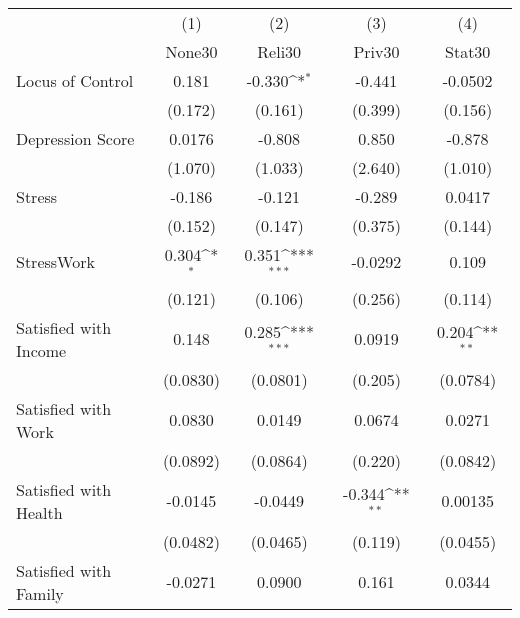 {
\def\sym#1{\ifmmode^{#1}\else\(^{#1}\)\fi}
\begin{tabular}{l*{4}{c}}
\hline\hline
            &\multicolumn{1}{c}{(1)}&\multicolumn{1}{c}{(2)}&\multicolumn{1}{c}{(3)}&\multicolumn{1}{c}{(4)}\\
            &\multicolumn{1}{c}{None30}&\multicolumn{1}{c}{Reli30}&\multicolumn{1}{c}{Priv30}&\multicolumn{1}{c}{Stat30}\\
\hline
Locus of Control&       0.181         &      -0.330\sym{*}  &      -0.441         &     -0.0502         \\
            &     (0.172)         &     (0.161)         &     (0.399)         &     (0.156)         \\
[1em]
Depression Score&      0.0176         &      -0.808         &       0.850         &      -0.878         \\
            &     (1.070)         &     (1.033)         &     (2.640)         &     (1.010)         \\
[1em]
Stress      &      -0.186         &      -0.121         &      -0.289         &      0.0417         \\
            &     (0.152)         &     (0.147)         &     (0.375)         &     (0.144)         \\
[1em]
StressWork  &       0.304\sym{*}  &       0.351\sym{***}&     -0.0292         &       0.109         \\
            &     (0.121)         &     (0.106)         &     (0.256)         &     (0.114)         \\
[1em]
Satisfied with Income&       0.148         &       0.285\sym{***}&      0.0919         &       0.204\sym{**} \\
            &    (0.0830)         &    (0.0801)         &     (0.205)         &    (0.0784)         \\
[1em]
Satisfied with Work&      0.0830         &      0.0149         &      0.0674         &      0.0271         \\
            &    (0.0892)         &    (0.0864)         &     (0.220)         &    (0.0842)         \\
[1em]
Satisfied with Health&     -0.0145         &     -0.0449         &      -0.344\sym{**} &     0.00135         \\
            &    (0.0482)         &    (0.0465)         &     (0.119)         &    (0.0455)         \\
[1em]
Satisfied with Family&     -0.0271         &      0.0900         &       0.161         &      0.0344         \\

\end{tabular}}

